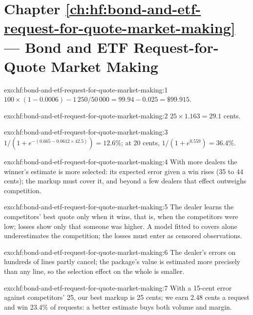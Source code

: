 \section*{Chapter \ref{ch:hf:bond-and-etf-request-for-quote-market-making} --- Bond and ETF Request-for-Quote Market Making}

\begin{solution}{exo:hf:bond-and-etf-request-for-quote-market-making:1}
$100\times(1-0.0006)-1\,250/50\,000=99.94-0.025=\$99.915$.
\end{solution}

\begin{solution}{exo:hf:bond-and-etf-request-for-quote-market-making:2}
$25\times1.163=29.1$ cents.
\end{solution}

\begin{solution}{exo:hf:bond-and-etf-request-for-quote-market-making:3}
$1/(1+e^{-(0.665-0.0612\times42.5)})=12.6\%$; at 20 cents, $1/(1+e^{0.559})=36.4\%$.
\end{solution}

\begin{solution}{exo:hf:bond-and-etf-request-for-quote-market-making:4}
With more dealers the winner's estimate is more selected: its expected error given a win rises (35 to 44 cents); the markup must cover it, and
beyond a few dealers that effect outweighs competition.
\end{solution}

\begin{solution}{exo:hf:bond-and-etf-request-for-quote-market-making:5}
The dealer learns the competitors' best quote only when it wins, that is, when the competitors were low; losses show only that someone was higher.
A model fitted to covers alone underestimates the competition; the losses must enter as censored observations.
\end{solution}

\begin{solution}{exo:hf:bond-and-etf-request-for-quote-market-making:6}
The dealer's errors on hundreds of lines partly cancel; the package's value is estimated more precisely than any line, so the selection effect on
the whole is smaller.
\end{solution}

\begin{solution}{exo:hf:bond-and-etf-request-for-quote-market-making:7}
With a 15-cent error against competitors' 25, our best markup is 25 cents; we earn 2.48 cents a request and win 23.4\% of requests: a better
estimate buys both volume and margin.
\end{solution}

